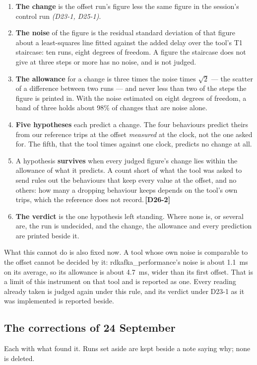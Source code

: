 \documentclass[11pt]{article}
\newcommand{\gl}[1]{{\color{soft}\itshape\small (#1)}}
\newcommand{\chg}[1]{\,{\color{chgcol}\bfseries\footnotesize[#1]}}
\begin{document}
\begin{enumerate}
  \item \textbf{The change} is the offset run's figure less the same figure in the session's
        control run \gl{D23-1, D25-1}.
  \item \textbf{The noise} of the figure is the residual standard deviation of that figure about
        a least-squares line fitted against the added delay over the tool's T1 staircase: ten
        runs, eight degrees of freedom. A figure the staircase does not give at three steps or
        more has no noise, and is not judged.
  \item \textbf{The allowance} for a change is three times the noise times $\sqrt{2}$ --- the
        scatter of a difference between two runs --- and never less than two of the steps the
        figure is printed in. With the noise estimated on eight degrees of freedom, a band of
        three holds about 98\% of changes that are noise alone.
  \item \textbf{Five hypotheses} each predict a change. The four behaviours predict theirs from
        our reference trips at the offset \emph{measured} at the clock, not the one asked for.
        The fifth, that the tool times against one clock, predicts no change at all.
  \item A hypothesis \textbf{survives} when every judged figure's change lies within the
        allowance of what it predicts. A count short of what the tool was asked to send rules
        out the behaviours that keep every value at the offset, and no others: how many a
        dropping behaviour keeps depends on the tool's own trips, which the reference
        does not record.\chg{D26-2}
  \item \textbf{The verdict} is the one hypothesis left standing. Where none is, or several are,
        the run is undecided, and the change, the allowance and every prediction are printed
        beside it.
\end{enumerate}

What this cannot do is also fixed now. A tool whose own noise is comparable to the offset cannot
be decided by it: rdkafka\_performance's noise is about 1.1~ms on its average, so its allowance
is about 4.7~ms, wider than its first offset. That is a limit of this instrument on that tool and
is reported as one. Every reading already taken is judged again under this rule, and its verdict
under D23-1 as it was implemented is reported beside.

\subsection*{The corrections of 24 September}
Each with what found it. Runs set aside are kept beside a note saying why; none is deleted.
\end{document}
